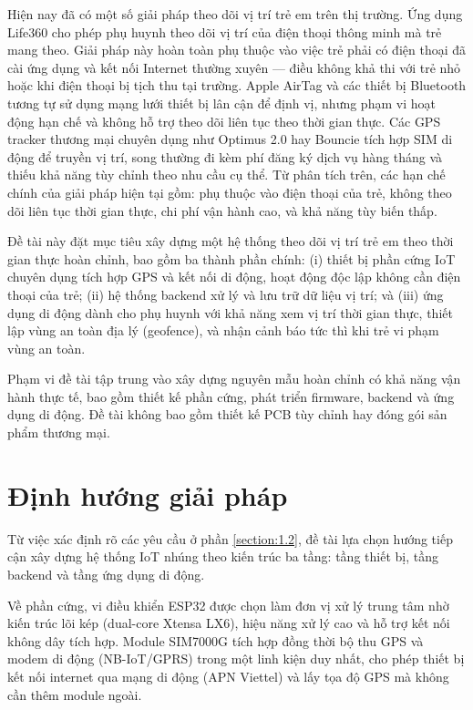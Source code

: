 \documentclass[../DoAn.tex]{subfiles}
\begin{document}
Hiện nay đã có một số giải pháp theo dõi vị trí trẻ em trên thị trường. Ứng dụng Life360 \cite{life360} cho phép phụ huynh theo dõi vị trí của điện thoại thông minh mà trẻ mang theo. Giải pháp này hoàn toàn phụ thuộc vào việc trẻ phải có điện thoại đã cài ứng dụng và kết nối Internet thường xuyên — điều không khả thi với trẻ nhỏ hoặc khi điện thoại bị tịch thu tại trường. Apple AirTag và các thiết bị Bluetooth tương tự sử dụng mạng lưới thiết bị lân cận để định vị, nhưng phạm vi hoạt động hạn chế và không hỗ trợ theo dõi liên tục theo thời gian thực. Các GPS tracker thương mại chuyên dụng như Optimus 2.0 hay Bouncie tích hợp SIM di động để truyền vị trí, song thường đi kèm phí đăng ký dịch vụ hàng tháng và thiếu khả năng tùy chỉnh theo nhu cầu cụ thể. Từ phân tích trên, các hạn chế chính của giải pháp hiện tại gồm: phụ thuộc vào điện thoại của trẻ, không theo dõi liên tục thời gian thực, chi phí vận hành cao, và khả năng tùy biến thấp.

Đề tài này đặt mục tiêu xây dựng một hệ thống theo dõi vị trí trẻ em theo thời gian thực hoàn chỉnh, bao gồm ba thành phần chính: (i) thiết bị phần cứng IoT chuyên dụng tích hợp GPS và kết nối di động, hoạt động độc lập không cần điện thoại của trẻ; (ii) hệ thống backend xử lý và lưu trữ dữ liệu vị trí; và (iii) ứng dụng di động dành cho phụ huynh với khả năng xem vị trí thời gian thực, thiết lập vùng an toàn địa lý (geofence), và nhận cảnh báo tức thì khi trẻ vi phạm vùng an toàn.

Phạm vi đề tài tập trung vào xây dựng nguyên mẫu hoàn chỉnh có khả năng vận hành thực tế, bao gồm thiết kế phần cứng, phát triển firmware, backend và ứng dụng di động. Đề tài không bao gồm thiết kế PCB tùy chỉnh hay đóng gói sản phẩm thương mại.

\section{Định hướng giải pháp}
\label{section:1.3}

Từ việc xác định rõ các yêu cầu ở phần \ref{section:1.2}, đề tài lựa chọn hướng tiếp cận xây dựng hệ thống IoT nhúng theo kiến trúc ba tầng: tầng thiết bị, tầng backend và tầng ứng dụng di động.

Về phần cứng, vi điều khiển ESP32 được chọn làm đơn vị xử lý trung tâm nhờ kiến trúc lõi kép (dual-core Xtensa LX6), hiệu năng xử lý cao và hỗ trợ kết nối không dây tích hợp. Module SIM7000G tích hợp đồng thời bộ thu GPS và modem di động (NB-IoT/GPRS) trong một linh kiện duy nhất, cho phép thiết bị kết nối internet qua mạng di động (APN Viettel) và lấy tọa độ GPS mà không cần thêm module ngoài.
\end{document}
